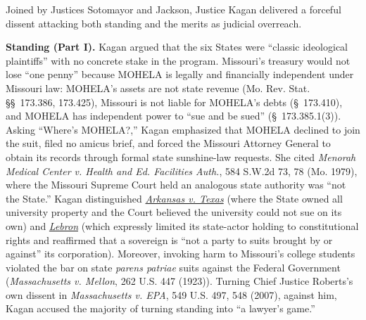 \documentclass[12pt]{article}
\begin{document}
Joined by Justices Sotomayor and Jackson, Justice Kagan delivered a forceful dissent attacking both standing and the merits as judicial overreach.

\textbf{Standing (Part I).} Kagan argued that the six States were ``classic ideological plaintiffs'' with no concrete stake in the program. Missouri's treasury would not lose ``one penny'' because MOHELA is legally and financially independent under Missouri law: MOHELA's assets are not state revenue (Mo. Rev. Stat. \S\S~173.386, 173.425), Missouri is not liable for MOHELA's debts (\S~173.410), and MOHELA has independent power to ``sue and be sued'' (\S~173.385.1(3)). Asking ``Where's MOHELA?,'' Kagan emphasized that MOHELA declined to join the suit, filed no amicus brief, and forced the Missouri Attorney General to obtain its records through formal state sunshine-law requests. She cited \textit{Menorah Medical Center v. Health and Ed. Facilities Auth.}, 584 S.W.2d 73, 78 (Mo. 1979), where the Missouri Supreme Court held an analogous state authority was ``not the State.'' Kagan distinguished \href{https://supreme.justia.com/cases/federal/us/346/368/}{\textit{Arkansas v. Texas}} (where the State owned all university property and the Court believed the university could not sue on its own) and \href{https://supreme.justia.com/cases/federal/us/513/374/}{\textit{Lebron}} (which expressly limited its state-actor holding to constitutional rights and reaffirmed that a sovereign is ``not a party to suits brought by or against'' its corporation). Moreover, invoking harm to Missouri's college students violated the bar on state \textit{parens patriae} suits against the Federal Government (\textit{Massachusetts v. Mellon}, 262 U.S. 447 (1923)). Turning Chief Justice Roberts's own dissent in \textit{Massachusetts v. EPA}, 549 U.S. 497, 548 (2007), against him, Kagan accused the majority of turning standing into ``a lawyer's game.''
\end{document}
